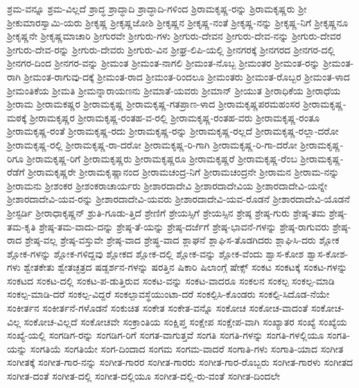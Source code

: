 {ಶ್ರಮ-ವನ್ನೂ
ಶ್ರಮ-ವಿಲ್ಲದೆ
ಶ್ರಾದ್ಧ
ಶ್ರಾದ್ಧಾದಿ
ಶ್ರಾದ್ಧಾದಿ-ಗಳಿಂದ
ಶ್ರಿರಾಮಕೃಷ್ಣ-ರನ್ನು
ಶ್ರಿರಾಮಕೃಷ್ಣರು
ಶ್ರೀ
ಶ್ರೀಕುಮಾರಸ್ವಾಮಿ-ಯರು
ಶ್ರೀಕೃಷ್ಣ
ಶ್ರೀಕೃಷ್ಣಜೋಶಿ
ಶ್ರೀಕೃಷ್ಣನ
ಶ್ರೀಕೃಷ್ಣ-ನಂತೆ
ಶ್ರೀಕೃಷ್ಣ-ನನ್ನು
ಶ್ರೀಕೃಷ್ಣ-ನಿಗೆ
ಶ್ರೀಕೃಷ್ಣನೂ
ಶ್ರೀಕೃಷ್ಣನೇ
ಶ್ರೀಕೃಷ್ಣಮಾಚಾರಿ
ಶ್ರೀಗುರವೇ
ಶ್ರೀಗುರು-ಗಳು
ಶ್ರೀಗುರು-ದೇವನ
ಶ್ರೀಗುರು-ದೇವ-ನನ್ನು
ಶ್ರೀಗುರು-ದೇವರ
ಶ್ರೀಗುರು-ದೇವ-ರನ್ನು
ಶ್ರೀಗುರು-ದೇವರು
ಶ್ರೀಗುರು-ವಿನ
ಶ್ರೀಘ್ರ-ಲಿಪಿ-ಯಲ್ಲಿ
ಶ್ರೀನಗರಕ್ಕೆ
ಶ್ರೀನಗರದ
ಶ್ರೀನಗರ-ದಲ್ಲಿ
ಶ್ರೀನಗರ-ದಿಂದ
ಶ್ರೀನಗರ-ವನ್ನು
ಶ್ರೀಮಂತ
ಶ್ರೀಮಂತ-ನಾಗಲಿ
ಶ್ರೀಮಂತ-ನೊಬ್ಬ
ಶ್ರೀಮಂತರ
ಶ್ರೀಮಂತ-ರನ್ನು
ಶ್ರೀಮಂತ-ರಾಗಿ
ಶ್ರೀಮಂತ-ರಾಗುವು-ದಕ್ಕೆ
ಶ್ರೀಮಂತ-ರಾದ
ಶ್ರೀಮಂತ-ರಿಂದಲೂ
ಶ್ರೀಮಂತರು
ಶ್ರೀಮಂತ-ರೊಬ್ಬರ
ಶ್ರೀಮಂತ-ಳಾದ
ಶ್ರೀಮಂತಿಕೆಯ
ಶ್ರೀಮತಿ
ಶ್ರೀಮನ್ನಾರಾಯಣನು
ಶ್ರೀಮಾತೆ-ಯವರು
ಶ್ರೀಮಾನ್
ಶ್ರೀಯುತ
ಶ್ರೀರಾಧಿಕೆಯ
ಶ್ರೀರಾಧೆಯ
ಶ್ರೀರಾಮ
ಶ್ರೀರಾಮಕಷ್ಣರ
ಶ್ರೀರಾಮಕೃಷ್ಣ
ಶ್ರೀರಾಮಕೃಷ್ಣ-ಗತಪ್ರಾಣ-ಳಾದ
ಶ್ರೀರಾಮಕೃಷ್ಣಪರಮಹಂಸರ
ಶ್ರೀರಾಮಕೃಷ್ಣ-ಮಠಕ್ಕೆ
ಶ್ರೀರಾಮಕೃಷ್ಣರ
ಶ್ರೀರಾಮಕೃಷ್ಣ-ರಂತಹ-ವ-ರಲ್ಲಿ
ಶ್ರೀರಾಮಕೃಷ್ಣ-ರಂತಹ-ವರು
ಶ್ರೀರಾಮಕೃಷ್ಣ-ರಂತೂ
ಶ್ರೀರಾಮಕೃಷ್ಣ-ರಂತೆ
ಶ್ರೀರಾಮಕೃಷ್ಣ-ರದು
ಶ್ರೀರಾಮಕೃಷ್ಣ-ರನ್ನು
ಶ್ರೀರಾಮಕೃಷ್ಣ-ರಲ್ಲದೆ
ಶ್ರೀರಾಮಕೃಷ್ಣ-ರಲ್ಲಾ-ದರೋ
ಶ್ರೀರಾಮಕೃಷ್ಣ-ರಲ್ಲಿ
ಶ್ರೀರಾಮಕೃಷ್ಣ-ರಾ-ದರೋ
ಶ್ರೀರಾಮಕೃಷ್ಣ-ರಿ-ಗಾಗಿ
ಶ್ರೀರಾಮಕೃಷ್ಣ-ರಿ-ಗಾ-ದರೋ
ಶ್ರೀರಾಮಕೃಷ್ಣ-ರಿಗೂ
ಶ್ರೀರಾಮಕೃಷ್ಣ-ರಿಗೆ
ಶ್ರೀರಾಮಕೃಷ್ಣರು
ಶ್ರೀರಾಮಕೃಷ್ಣರೂ
ಶ್ರೀರಾಮಕೃಷ್ಣರೆ
ಶ್ರೀರಾಮಕೃಷ್ಣ-ರೆಂಬ
ಶ್ರೀರಾಮಕೃಷ್ಣ-ರೆಡೆಗೆ
ಶ್ರೀರಾಮಕೃಷ್ಣರೇ
ಶ್ರೀರಾಮಕೃಷ್ಣಾನಂದ
ಶ್ರೀರಾಮಚಂದ್ರ-ನಿಗೆ
ಶ್ರೀರಾಮಚಂದ್ರನೇ
ಶ್ರೀರಾಮನ
ಶ್ರೀರಾಮ-ನನ್ನು
ಶ್ರೀರಾಮನು
ಶ್ರೀಶಂಕರ
ಶ್ರೀಶಂಕರಾಚಾರ್ಯರು
ಶ್ರೀಶಾರದಾದೇವಿ
ಶ್ರೀಶಾರದಾದೇವಿಯ
ಶ್ರೀಶಾರದಾದೇವಿ-ಯನ್ನೇ
ಶ್ರೀಶಾರದಾದೇವಿ-ಯವ-ರನ್ನು
ಶ್ರೀಶಾರದಾದೇವಿ-ಯವರು
ಶ್ರೀಶಾರದಾದೇವಿ-ಯವ-ರೊಡನೆ
ಶ್ರೀಶಾರದಾದೇವಿ-ಯೊಡನೆ
ಶ್ರೀಸ್ಟರ್ಡಿ
ಶ್ರೀರಾಧಾಕೃಷ್ಣನ್
ಶ್ರುತಿ-ಗೂಡು-ತ್ತಿದೆ
ಶ್ರೇಣಿಗೆ
ಶ್ರೇಯಸ್ಸಿಗೆ
ಶ್ರೇಯಸ್ಸಿನ
ಶ್ರೇಷ್ಠ
ಶ್ರೇಷ್ಠ-ಗುರು
ಶ್ರೇಷ್ಠ-ತಮ
ಶ್ರೇಷ್ಠ-ತಮ-ಕೃತಿ
ಶ್ರೇಷ್ಠ-ತಮ-ವಾದು-ದನ್ನು
ಶ್ರೇಷ್ಠ-ತೆ-ಯನ್ನು
ಶ್ರೇಷ್ಠ-ದರ್ಜೆಗೆ
ಶ್ರೇಷ್ಠ-ಭಾವನೆ-ಗಳನ್ನು
ಶ್ರೇಷ್ಠ-ರಾಗುವರು
ಶ್ರೇಷ್ಠ-ರಾದ
ಶ್ರೇಷ್ಠ-ವಲ್ಲ
ಶ್ರೇಷ್ಠ-ವಸ್ತುವೇ
ಶ್ರೇಷ್ಠ-ವಾದ
ಶ್ರೇಷ್ಥ-ವಾದ
ಶ್ಲಾಘನೆ
ಶ್ಲಾಘಿಸ-ತೊಡಗಿದರು
ಶ್ಲಾಘಿಸಿ-ದರು
ಶ್ಲೋಕ
ಶ್ಲೋಕ-ಗಳನ್ನು
ಶ್ಲೋಕ-ಗಳಿದ್ದವು
ಶ್ಲೋಕದ
ಶ್ಲೋಕ-ದಲ್ಲಿ
ಶ್ಲೋಕ-ವನ್ನು
ಶ್ಲೋಕ-ವೆಂದು
ಶ್ವಾಸ-ಕೋಶ
ಶ್ವಾಸ-ಕೋಶ-ಗಳು
ಶ್ವೇತಕೇತು
ಶ್ವೇತಚ್ಛತ್ರದ
ಷಡ್ದರ್ಶನ-ಗಳನ್ನು
ಷರತ್ತಿನ
ಷಿಕಾರಿ
ಷಿಲಾಂಗ್ಗೆ
ಷೇಕ್ಸ್
ಸಂಕಟ
ಸಂಕಟಕ್ಕೆ
ಸಂಕಟ-ಗಳನ್ನು
ಸಂಕಟದ
ಸಂಕಟ-ದಲ್ಲಿ
ಸಂಕಟ-ಪ-ಡುತ್ತಿರುವ
ಸಂಕಟ-ವನ್ನು
ಸಂಕಟ-ವಾದರೂ
ಸಂಕಲನ
ಸಂಕಲ್ಪ
ಸಂಕಲ್ಪ-ಮಾಡಿ
ಸಂಕಲ್ಪ-ಮಾಡಿ-ದರೆ
ಸಂಕಲ್ಪ-ವಿದ್ದರೆ
ಸಂಕಲ್ಪಾವಸ್ಥೆಯುಂಟಾ-ದರೆ
ಸಂಕಲ್ಪಿಸಿ-ಕೊಂಡರು
ಸಂಕಲ್ಪಿ-ಸಿದೊಡ-ನೆಯೇ
ಸಂಕೀರ್ತನ
ಸಂಕೀರ್ತನೆ-ಗಳೊಡನೆ
ಸಂಕುಚಿತ
ಸಂಕೇತ
ಸಂಕೇತ-ವನ್ನೊ
ಸಂಕೋಚ
ಸಂಕೋಚ-ವಾದಂತೆ
ಸಂಕೋಚ-ವಿಲ್ಲ
ಸಂಕೋಚ-ವಿಲ್ಲದೆ
ಸಂಕೋಚವೇ
ಸಂಕ್ರಾಂತಿಯ
ಸಂಕ್ಷಿಪ್ತ
ಸಂಕ್ಷೇಪ
ಸಂಕ್ಷೇಪ-ವಾಗಿ
ಸಂಖ್ಯಾತರ
ಸಂಖ್ಯೆ
ಸಂಖ್ಯೆಯ
ಸಂಖ್ಯೆ-ಯಲ್ಲಿ
ಸಂಗಡಿಗ-ರನ್ನು
ಸಂಗಡಿಗ-ರಿಗೆ
ಸಂಗತ-ವಾಗುತ್ತವೆ
ಸಂಗತಿ
ಸಂಗತಿ-ಗಳನ್ನು
ಸಂಗತಿ-ಗಳಲ್ಲಿಯೂ
ಸಂಗತಿ-ಯನ್ನು
ಸಂಗತಿಯೆ
ಸಂಗತಿಯೇ
ಸಂಗ-ದಿಂದಾದ
ಸಂಗಮ
ಸಂಗಮ-ವಾದರೆ
ಸಂಗಾತಿ-ಗಳು
ಸಂಗಾತಿ-ಯಾದ
ಸಂಗೀತ
ಸಂಗೀತಕ್ಕೆ
ಸಂಗೀತ-ಗಾರ-ನನ್ನು
ಸಂಗೀತ-ಗಾರರ
ಸಂಗೀತ-ಗಾರರು
ಸಂಗೀತ-ಗಾರ-ರೊಬ್ಬರು
ಸಂಗೀತ-ಗಾರಳು
ಸಂಗೀತದ
ಸಂಗೀತ-ದಂತೆ
ಸಂಗೀತ-ದಲ್ಲಿ
ಸಂಗೀತ-ದಲ್ಲಿಯೂ
ಸಂಗೀತ-ದಲ್ಲಿ-ರು-ವಂತೆ
ಸಂಗೀತ-ದಿಂದಲೇ
}
